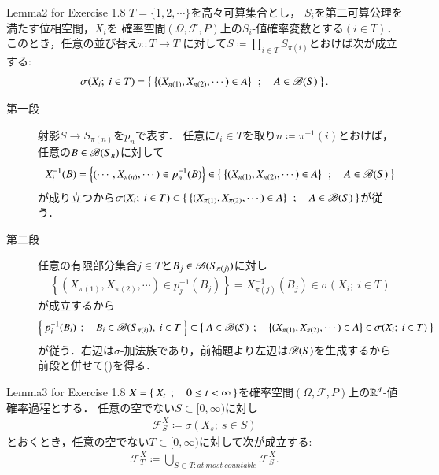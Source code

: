 \begin{itembox}[l]{Lemma2 for Exercise 1.8}
	$T = \{1,2,\cdots\}$を高々可算集合とし，
	$S_i$を第二可算公理を満たす位相空間，$X_i$を
	確率空間$(\Omega,\mathscr{F},P)$上の$S_i$-値確率変数とする$(i \in T)$．
	このとき，任意の並び替え$\pi:T \longrightarrow T$
	に対して$S \coloneqq \prod_{i \in T} S_{\pi(i)}$とおけば次が成立する:
	\begin{align}
		\sigma(X_i;\ i \in T) = \left\{\ \left\{ (X_{\pi(1)},X_{\pi(2)},\cdots) \in A \right\}\ \, ; \quad A \in \mathscr{B}(S)\ \right\}.
		\label{eq:lem2_for_chap_1_exercise_1_8_1}
	\end{align}
\end{itembox}

\begin{prf}\mbox{}
	\begin{description}
		\item[第一段]
			射影$S \longrightarrow S_{\pi(n)}$を$p_n$で表す．
			任意に$t_i \in T$を取り$n \coloneqq \pi^{-1}(i)$とおけば，
			任意の$B \in \mathscr{B}(S_n)$に対して
			\begin{align}
				X_i^{-1}(B) = \left\{ (\cdots, X_{\pi(n)},\cdots) \in p_n^{-1}(B) \right\} \in \left\{\ \left\{ (X_{\pi(1)}, X_{\pi(2)},\cdots) \in A \right\}\ \, ; \quad A \in \mathscr{B}(S)\ \right\}
			\end{align}
			が成り立つから$\sigma(X_i;\ i \in T) \subset 
			\left\{\ \left\{ (X_{\pi(1)}, X_{\pi(2)},\cdots) \in A \right\}\ \, ; \quad A \in \mathscr{B}(S)\ \right\}$が従う．
		
		\item[第二段]
			任意の有限部分集合$j \in T$と$B_j \in \mathscr{B}(S_{\pi(j)})$に対し
			\begin{align}
				\left\{ (X_{\pi(1)}, X_{\pi(2)},\cdots) \in p_j^{-1}(B_j) \right\}
				= X_{\pi(j)}^{-1}(B_j)
				\in \sigma(X_i;\ i \in T)
			\end{align}
			が成立するから
			\begin{align}
				\left\{\ p_i^{-1}(B_i)\ \, ; \quad B_i \in \mathscr{B}(S_{\pi(i)}),\ i \in T\ \right\}
				\subset \left\{\ A \in \mathscr{B}(S)\ \, ; \quad \left\{ (X_{\pi(1)}, X_{\pi(2)},\cdots) \in A \right\} \in \sigma(X_i;\ i \in T)\ \right\}
			\end{align}
			が従う．右辺は$\sigma$-加法族であり，前補題より左辺は$\mathscr{B}(S)$を生成するから
			前段と併せて()を得る．
			\QED
	\end{description}
\end{prf}

\begin{itembox}[l]{Lemma3 for Exercise 1.8}
	$X = \left\{\ X_t\ \, ; \quad 0 \leq t < \infty\ \right\}$を確率空間$(\Omega,\mathscr{F},P)$上の$\mathbb{R}^d$-値確率過程とする．
	任意の空でない$S \subset [0,\infty)$に対し
	\begin{align}
		\mathcal{F}^X_S \coloneqq \sigma(X_s;\ s \in S)
	\end{align}
	とおくとき，任意の空でない$T \subset [0,\infty)$に対して次が成立する:
	\begin{align}
		\mathcal{F}^X_T \coloneqq \bigcup_{S \subset T:at\ most\ countable} \mathcal{F}^X_S.
		\label{eq:lem3_for_chap_1_exercise_1_8_1}
	\end{align}
\end{itembox}

